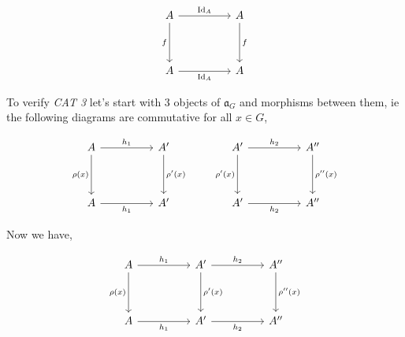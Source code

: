 \documentclass[11pt,a4paper]{colorart}
\def\mab{\mathfrak}
\begin{document}
\[\begin{tikzcd}
	A && {A} \\
	\\
	A && {A}
	\arrow["f"', from=1-1, to=3-1]
	\arrow["{\text{Id}_A}"', from=3-1, to=3-3]
	\arrow["f", from=1-3, to=3-3]
	\arrow["{\text{Id}_A}", from=1-1, to=1-3]
\end{tikzcd}\]

To verify \textit{CAT 3} let's start with 3 objects of $\mab{a}_G$ and morphisms between them, ie the following diagrams are commutative for all $x \in G$,

\[\begin{tikzcd}
	A && {A^\prime} && {A^\prime} && {A^{\prime \prime}} \\
	\\
	A && {A^\prime} && {A^\prime} && {A^{\prime \prime}}
	\arrow["{\rho(x)}"', from=1-1, to=3-1]
	\arrow["{h_1}"', from=3-1, to=3-3]
	\arrow["{\rho^\prime(x)}", from=1-3, to=3-3]
	\arrow["{h_1}", from=1-1, to=1-3]
	\arrow["{\rho^\prime(x)}"', from=1-5, to=3-5]
	\arrow["{\rho^{\prime \prime}(x)}", from=1-7, to=3-7]
	\arrow["{h_2}", from=1-5, to=1-7]
	\arrow["{h_2}"', from=3-5, to=3-7]
\end{tikzcd}\]

Now we have,

\[\begin{tikzcd}
	A && {A^\prime} && {A^{\prime\prime}} \\
	\\
	A && {A^\prime} && {A^{\prime\prime}}
	\arrow["{\rho(x)}"', from=1-1, to=3-1]
	\arrow["{h_1}"', from=3-1, to=3-3]
	\arrow["{\rho^\prime(x)}", from=1-3, to=3-3]
	\arrow["{h_1}", from=1-1, to=1-3]
	\arrow["{\rho^{\prime \prime}(x)}", from=1-5, to=3-5]
	\arrow["{h_2}"', from=3-3, to=3-5]
	\arrow["{h_2}", from=1-3, to=1-5]
\end{tikzcd}\]
\end{document}
